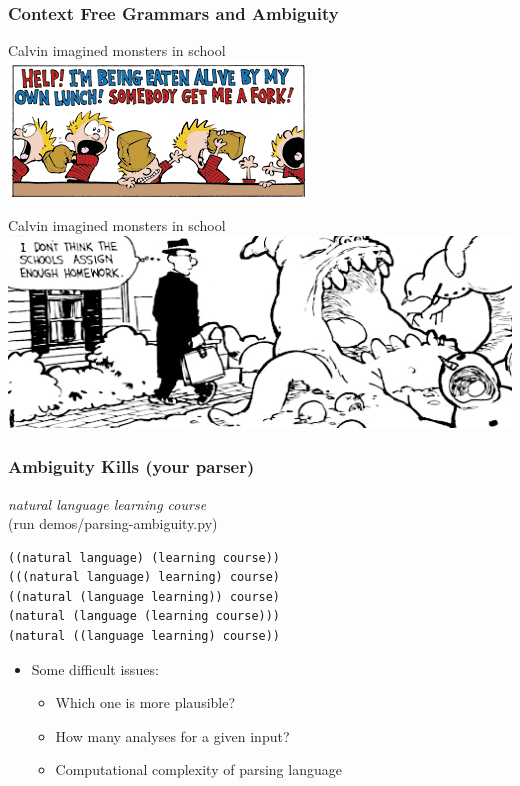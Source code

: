 \begin{frame}[fragile]
\frametitle{Context Free Grammars and Ambiguity}
\begin{block}{Calvin imagined monsters in school}
\includegraphics[scale=.6]{figures/monsterinschool.png}
\end{block}
\begin{block}{Calvin imagined monsters in school}
\includegraphics[scale=.4]{figures/schoolmonsters.png}
\end{block}

\end{frame}

\begin{frame}[fragile]
\frametitle{Ambiguity Kills (your parser)}
{\em natural language learning course} \\
(run demos/parsing-ambiguity.py)
\begin{verbatim}
((natural language) (learning course))
(((natural language) learning) course)
((natural (language learning)) course)
(natural (language (learning course)))
(natural ((language learning) course))
\end{verbatim}
\begin{itemize}
\item Some difficult issues:
\begin{itemize}
\item Which one is more plausible?
\item How many analyses for a given input? 
\item Computational complexity of parsing language
\end{itemize}
\end{itemize}
\end{frame}

